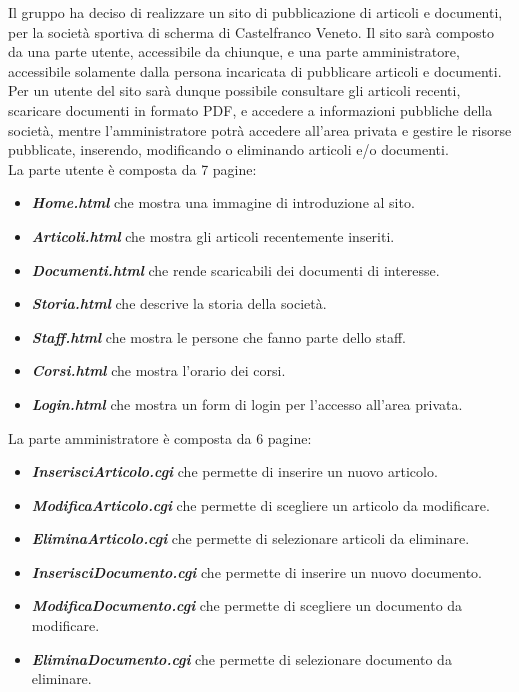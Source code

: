 Il gruppo ha deciso di realizzare un sito di pubblicazione di articoli e documenti, per la societ\`a sportiva di scherma di Castelfranco Veneto. Il sito sar\`a composto da una parte utente, accessibile da chiunque, e una parte amministratore, accessibile solamente dalla persona incaricata di pubblicare articoli e documenti. 
Per un utente del sito sar\`a dunque possibile consultare gli articoli recenti, scaricare documenti in formato PDF, e accedere a informazioni pubbliche della societ\`a, mentre l'amministratore potr\`a accedere all'area privata e gestire le risorse pubblicate, inserendo, modificando o eliminando articoli e/o documenti.\\

\noindent La parte utente \`e composta da 7 pagine:
\begin{itemize}
	\item {\bfseries\textit{Home.html}} che mostra una immagine di introduzione al sito.
	\item {\bfseries\textit{Articoli.html}} che mostra gli articoli recentemente inseriti.
	\item {\bfseries\textit{Documenti.html}} che rende scaricabili dei documenti di interesse.
	\item {\bfseries\textit{Storia.html}} che descrive la storia della societ\`a.
	\item {\bfseries\textit{Staff.html}} che mostra le persone che fanno parte dello staff.
	\item {\bfseries\textit{Corsi.html}} che mostra l'orario dei corsi.
	\item {\bfseries\textit{Login.html}} che mostra un form di login per l'accesso all'area privata.
\end{itemize}
La parte amministratore \`e composta da 6 pagine:
\begin{itemize}
	\item {\bfseries\textit{InserisciArticolo.cgi}} che permette di inserire un nuovo articolo.
	\item {\bfseries\textit{ModificaArticolo.cgi}} che permette di scegliere un articolo da modificare.
	\item {\bfseries\textit{EliminaArticolo.cgi}} che permette di selezionare articoli da eliminare.
	\item {\bfseries\textit{InserisciDocumento.cgi}} che permette di inserire un nuovo documento.
	\item {\bfseries\textit{ModificaDocumento.cgi}} che permette di scegliere un documento da modificare.
	\item {\bfseries\textit{EliminaDocumento.cgi}} che permette di selezionare documento da eliminare.
\end{itemize}

